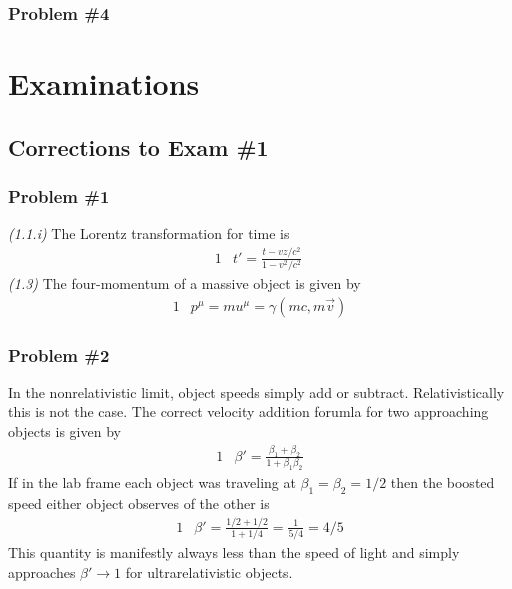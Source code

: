\documentclass[]{article}
\numberwithin{equation}{subsection}
\begin{document}
\subsubsection*{Problem \#4}

\section{Examinations}
\subsection{Corrections to Exam \#1}
\subsubsection*{Problem \#1}
\emph{(1.1.i)} The Lorentz transformation for time is
\begin{alignat}{1}
  \label{k01}            &t'=\frac{t-vz/c^{2}}{1-v^{2}/c^{2}}\
\end{alignat}
\emph{(1.3)} The four-momentum of a massive object is given by
\begin{alignat}{1}
  \label{k02}            &p^{\mu}=mu^{\mu}=\gamma(mc,m\vec{v})
\end{alignat}
\subsubsection*{Problem \#2}
In the nonrelativistic limit, object speeds simply add or subtract. Relativistically this is not the case. The correct velocity addition forumla for two approaching objects is given by
\begin{alignat}{1}
  \label{k03}            &\beta'=\frac{\beta_{1}+\beta_{2}}{1+\beta_{1}\beta_{2}}
\end{alignat}
If in the lab frame each object was traveling at $\beta_{1}=\beta_{2}=1/2$ then the boosted speed either object observes of the other is
\begin{alignat}{1}
  \label{k04}            &\beta'=\frac{1/2+1/2}{1+1/4}=\frac{1}{5/4}=4/5
\end{alignat}
This quantity is manifestly always less than the speed of light and simply approaches $\beta'\rightarrow1$ for ultrarelativistic objects.
\end{document}
